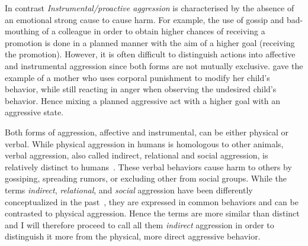 In contrast \textit{Instrumental/proactive aggression} is characterised by the absence of an emotional strong cause to cause harm.
For example, the use of gossip and bad-mouthing of a colleague in order to obtain higher chances of receiving a promotion is done in a planned manner with the aim of a higher goal (receiving the promotion).
However, it is often difficult to distinguish actions into affective and instrumental aggression since both forms are not mutually exclusive.
\citet{Geen2001} gave the example of a mother who uses corporal punishment to modify her child's behavior, while still reacting in anger when observing the undesired child's behavior.
Hence mixing a planned aggressive act with a higher goal with an aggressive state.

Both forms of aggression, affective and instrumental, can be either physical or verbal.
While physical aggression in humans is homologous to other animals, verbal aggression, also called indirect, relational and social aggression, is relatively distinct to humans~\cite{Archer2005}.
These verbal behaviors cause harm to others by gossiping, spreading rumors, or excluding other from social groups.
While the terms \textit{indirect}, \textit{relational}, and \textit{social} aggression have been differently conceptualized in the past~\cite{Archer2001}, they are expressed in common behaviors and can be contrasted to physical aggression.
Hence the terms are more similar than distinct and I will therefore proceed to call all them \textit{indirect} aggression in order to distinguish it more from the physical, more direct aggressive behavior\cite{Archer2005}.

